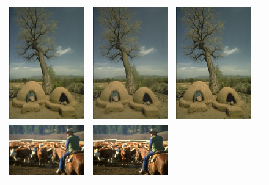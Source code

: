 \documentclass[10pt,twocolumn,letterpaper]{article}
\begin{document}
\begin{figure}[h!]
\begin{tabular}{cccc}
\includegraphics[width=1.5in]{images/used/appendix/jpg/BSD100/54082_SRResNet-MSE} &
\includegraphics[width=1.5in]{images/used/appendix/jpg/BSD100/54082_SRGAN-VGG54} &
\includegraphics[width=1.5in]{images/used/appendix/jpg/BSD100/54082_HR} \\
\includegraphics[width=1.5in]{images/used/appendix/jpg/BSD100/220075_bicubic}&
\includegraphics[width=1.5in]{images/used/appendix/jpg/BSD100/220075_SRResNet-MSE} &

\end{tabular}
\end{figure}
\end{document}
